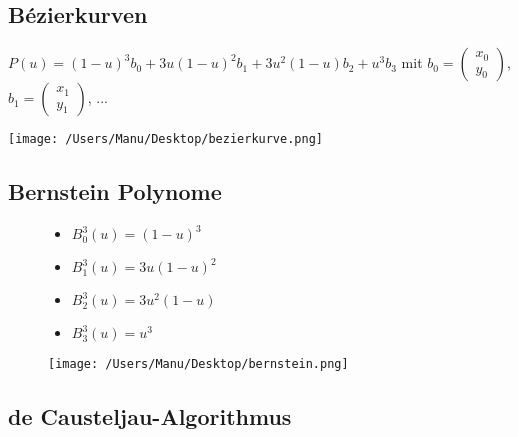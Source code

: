 \documentclass[paper=a4, fontsize=11pt]{scrartcl} %
\numberwithin{equation}{section} %
\numberwithin{figure}{section} %
\numberwithin{table}{section} %
\begin{document}
\subsection{Bézierkurven}

$P(u) = (1-u)^3 b_0 + 3u(1-u)^2 b_1 + 3u^2(1-u)b_2 + u^3 b_3$ mit $b_0 = \left(\begin{array}{c} x_0 \\ y_0 \end{array}\right)$, $b_1 = \left(\begin{array}{c} x_1 \\ y_1 \end{array}\right)$, ...

\texttt{[image: /Users/Manu/Desktop/bezierkurve.png]}

\subsection{Bernstein Polynome}

\begin{figure}[htbp]
\begin{minipage}[t]{6cm}
\vspace{0pt}
\begin{itemize}
\item $B^3_0(u) = (1-u)^3$
\item $B^3_1(u) = 3u(1-u)^2$
\item $B^3_2(u) = 3u^2(1-u)$
\item $B^3_3(u) = u^3$
\end{itemize}
\end{minipage}
\hfill
\begin{minipage}[t]{4cm}
\vspace{0pt}
\centering
\texttt{[image: /Users/Manu/Desktop/bernstein.png]}
\end{minipage}
\end{figure}

\subsection{de Causteljau-Algorithmus}
\end{document}
